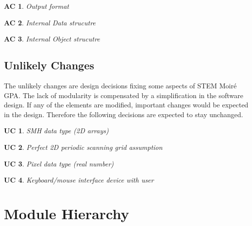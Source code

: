 \documentclass[12pt, titlepage]{article}
\newcommand{\progname}{STEM Moir{\'e} GPA}
\newtheorem{AC}{AC}
\newtheorem{UC}{UC}
\begin{document}
\begin{AC}\normalfont Output format
\label{AC_Output}
\end{AC}

\begin{AC}\normalfont Internal Data strucutre
\label{AC_Data}
\end{AC}

\begin{AC}\normalfont Internal Object strucutre
\label{AC_Object}
\end{AC}

\subsection{Unlikely Changes} \label{SecUchange}

The unlikely changes are design decisions fixing some aspects of \progname{}. 
The lack of modularity is compensated by a simplification in the software 
design. If any of the elements are modified, important changes would be expected 
in the design. Therefore the following decisions are expected to stay unchanged.

\begin{UC}\normalfont SMH data type (2D arrays)
\label{UC_Input_data}
\end{UC}

\begin{UC}\normalfont Perfect 2D periodic scanning grid assumption
\label{UC_Assum_2DPeriodicGrid}
\end{UC}

\begin{UC}\normalfont Pixel data type (real number)
\label{UC_Assum_Pixel}
\end{UC}

\begin{UC}\normalfont Keyboard/mouse interface device with user
\label{UC_Assum_Hardware}
\end{UC}

\section{Module Hierarchy} \label{SecMH}
\end{document}
